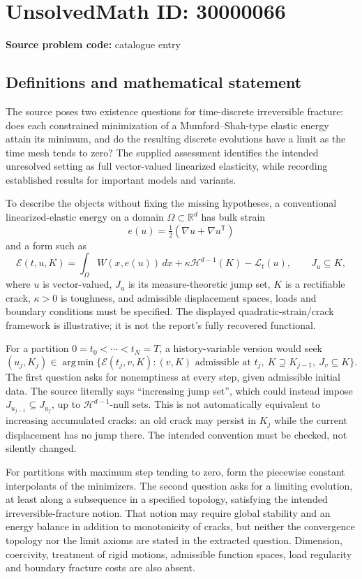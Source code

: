 \documentclass[11pt]{article}
\newcommand{\R}{\mathbb{R}}
\begin{document}
\section*{UnsolvedMath ID: 30000066}
\textbf{Source problem code:} catalogue entry
\subsection{Definitions and mathematical statement}
The source poses two existence questions for time-discrete irreversible fracture: does each constrained minimization of a Mumford--Shah-type elastic energy attain its minimum, and do the resulting discrete evolutions have a limit as the time mesh tends to zero? The supplied assessment identifies the intended unresolved setting as full vector-valued linearized elasticity, while recording established results for important models and variants.

To describe the objects without fixing the missing hypotheses, a conventional linearized-elastic energy on a domain $\Omega\subset\R^d$ has bulk strain
\[
 e(u)=\tfrac12(\nabla u+\nabla u^{\mathsf T})
\]
and a form such as
\[
 \mathcal E(t,u,K)=\int_\Omega W(x,e(u))\,dx
           +\kappa\mathcal H^{d-1}(K)-\mathcal L_t(u),
 \qquad J_u\subseteq K,
\]
where $u$ is vector-valued, $J_u$ is its measure-theoretic jump set, $K$ is a rectifiable crack, $\kappa>0$ is toughness, and admissible displacement spaces, loads and boundary conditions must be specified. The displayed quadratic-strain/crack framework is illustrative; it is not the report's fully recovered functional.

For a partition $0=t_0<\cdots<t_N=T$, a history-variable version would seek
\[
 (u_j,K_j)\in\operatorname*{arg\,min}
 \{\mathcal E(t_j,v,K):(v,K)\text{ admissible at }t_j,
                            \ K\supseteq K_{j-1},\ J_v\subseteq K\}.
\]
The first question asks for nonemptiness at every step, given admissible initial data. The source literally says ``increasing jump set'', which could instead impose $J_{u_{j-1}}\subseteq J_{u_j}$, up to $\mathcal H^{d-1}$-null sets. This is not automatically equivalent to increasing accumulated cracks: an old crack may persist in $K_j$ while the current displacement has no jump there. The intended convention must be checked, not silently changed.

For partitions with maximum step tending to zero, form the piecewise constant interpolants of the minimizers. The second question asks for a limiting evolution, at least along a subsequence in a specified topology, satisfying the intended irreversible-fracture notion. That notion may require global stability and an energy balance in addition to monotonicity of cracks, but neither the convergence topology nor the limit axioms are stated in the extracted question. Dimension, coercivity, treatment of rigid motions, admissible function spaces, load regularity and boundary fracture costs are also absent.
\end{document}
